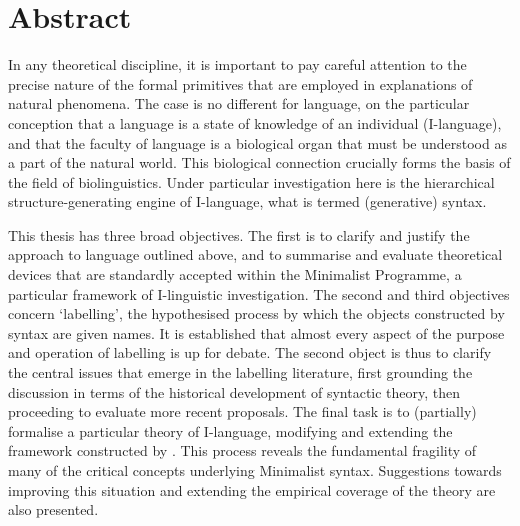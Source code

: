 \section*{Abstract}
In any theoretical discipline, it is important to pay careful attention to the precise nature of the formal primitives that are employed in explanations of natural phenomena. The case is no different for language, on the particular conception that a language is a state of knowledge of an individual (I-language), and that the faculty of language is a biological organ that must be understood as a part of the natural world. This biological connection crucially forms the basis of the field of biolinguistics. Under particular investigation here is the hierarchical structure-generating engine of I-language, what is termed (generative) syntax.

This thesis has three broad objectives. The first is to clarify and justify the approach to language outlined above, and to summarise and evaluate theoretical devices that are standardly accepted within the Minimalist Programme, a particular framework of I-linguistic investigation. The second and third objectives concern `labelling', the hypothesised process by which the objects constructed by syntax are given names. It is established that almost every aspect of the purpose and operation of labelling is up for debate. The second object is thus to clarify the central issues that emerge in the labelling literature, first grounding the discussion in terms of the historical development of syntactic theory, then proceeding to evaluate more recent proposals. The final task is to (partially) formalise a particular theory of I-language, modifying and extending the framework constructed by \textcite{CollinsC.StablerE_2016}. This process reveals the fundamental fragility of many of the critical concepts underlying Minimalist syntax. Suggestions towards improving this situation and extending the empirical coverage of the theory are also presented.
